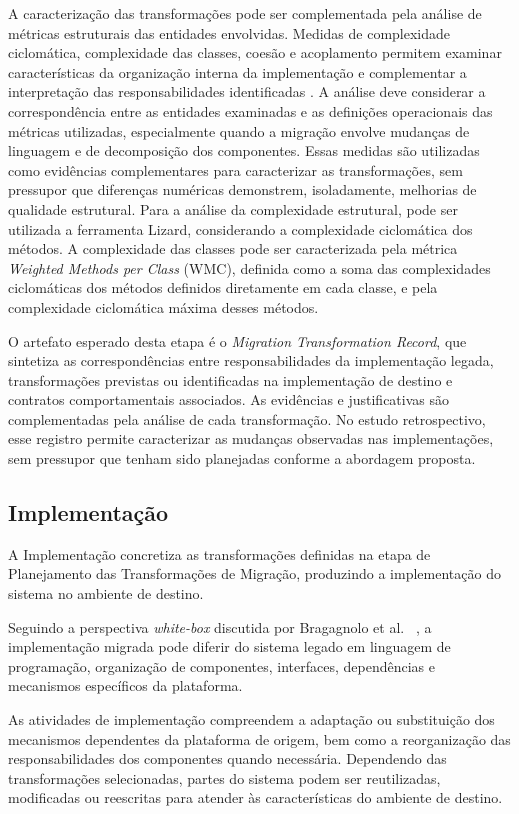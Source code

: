 A caracterização das transformações pode ser complementada pela análise de métricas estruturais das entidades envolvidas. Medidas de complexidade ciclomática, complexidade das classes, coesão e acoplamento permitem examinar características da organização interna da implementação e complementar a interpretação das responsabilidades identificadas \cite{McCabe1976,ChidamberKemerer1994}. A análise deve considerar a correspondência entre as entidades examinadas e as definições operacionais das métricas utilizadas, especialmente quando a migração envolve mudanças de linguagem e de decomposição dos componentes. Essas medidas são utilizadas como evidências complementares para caracterizar as transformações, sem pressupor que diferenças numéricas demonstrem, isoladamente, melhorias de qualidade estrutural. Para a análise da complexidade estrutural, pode ser utilizada a ferramenta Lizard, considerando a complexidade ciclomática dos métodos. A complexidade das classes pode ser caracterizada pela métrica \textit{Weighted Methods per Class} (WMC), definida como a soma das complexidades ciclomáticas dos métodos definidos diretamente em cada classe, e pela complexidade ciclomática máxima desses métodos.

O artefato esperado desta etapa é o \textit{Migration Transformation Record}, que sintetiza as correspondências entre responsabilidades da implementação legada, transformações previstas ou identificadas na implementação de destino e contratos comportamentais associados. As evidências e justificativas são complementadas pela análise de cada transformação. No estudo retrospectivo, esse registro permite caracterizar as mudanças observadas nas implementações, sem pressupor que tenham sido planejadas conforme a abordagem proposta.


\subsection{Implementação}

A Implementação concretiza as transformações
definidas na etapa de Planejamento das
Transformações de Migração, produzindo a
implementação do sistema no ambiente de destino.

Seguindo a perspectiva \textit{white-box}
discutida por Bragagnolo et al.~
\cite{BragagnoloMigration}, a implementação
migrada pode diferir do sistema legado em
linguagem de programação, organização de
componentes, interfaces, dependências e
mecanismos específicos da plataforma.

As atividades de implementação compreendem
a adaptação ou substituição dos mecanismos
dependentes da plataforma de origem, bem como
a reorganização das responsabilidades dos
componentes quando necessária. Dependendo
das transformações selecionadas, partes do
sistema podem ser reutilizadas, modificadas
ou reescritas para atender às características
do ambiente de destino.

